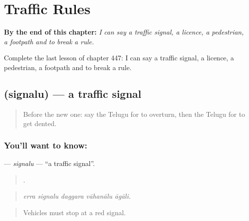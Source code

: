 
\chapter{Traffic Rules}
\label{ch:te-traffic-rules}

\begin{chapteropening}
\textbf{By the end of this chapter:} \emph{I can say a traffic signal, a licence, a pedestrian, a footpath and to break a rule.}

Complete the last lesson of chapter 447: I can say a traffic signal, a licence, a pedestrian, a footpath and to break a rule.
\end{chapteropening}

\section[\texorpdfstring{\te{సిగ్నలు} (signalu)}{సిగ్నలు (signalu)}]{ (signalu) — a traffic signal}

\label{lesson:TE-C447-signalu}



\begin{quote}
Before the new one: say the Telugu for to overturn, then the Telugu for to get dented.
\end{quote}

\subsection*{You'll want to know: }
\textbf{} — \emph{signalu} — \textquotedblleft{}a traffic signal\textquotedblright{}.

\begin{quote}
    .
\end{quote}

\begin{quote}
\emph{erra signalu daggara vāhanālu āgāli.}
\end{quote}

\begin{quote}
Vehicles must stop at a red signal.
\end{quote}


